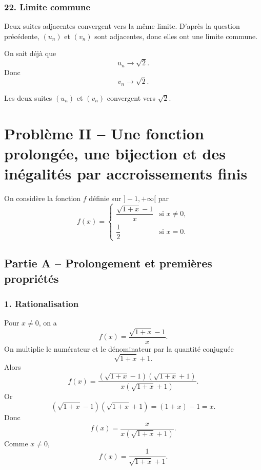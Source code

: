 \documentclass[11pt,a4paper]{article}
\begin{document}

\subsubsection*{22. Limite commune}

Deux suites adjacentes convergent vers la même limite. D'après la question précédente, \((u_n)\) et \((v_n)\) sont adjacentes, donc elles ont une limite commune.

On sait déjà que
\[
u_n\longrightarrow \sqrt2.
\]
Donc
\[
v_n\longrightarrow \sqrt2.
\]

\begin{resultatbox}
Les deux suites \((u_n)\) et \((v_n)\) convergent vers \(\sqrt2\).
\end{resultatbox}

\newpage


\section*{Problème II -- Une fonction prolongée, une bijection et des inégalités par accroissements finis}

On considère la fonction \(f\) définie sur \(]-1,+\infty[\) par
\[
f(x)=
\begin{cases}
\dfrac{\sqrt{1+x}-1}{x} & \text{si } x\neq 0,\\[1.2em]
\dfrac12 & \text{si } x=0.
\end{cases}
\]


\subsection*{Partie A -- Prolongement et premières propriétés}

\subsubsection*{1. Rationalisation}

Pour \(x\neq 0\), on a
\[
f(x)=\frac{\sqrt{1+x}-1}{x}.
\]
On multiplie le numérateur et le dénominateur par la quantité conjuguée
\[
\sqrt{1+x}+1.
\]
Alors
\[
f(x)
=
\frac{(\sqrt{1+x}-1)(\sqrt{1+x}+1)}{x(\sqrt{1+x}+1)}.
\]
Or
\[
(\sqrt{1+x}-1)(\sqrt{1+x}+1)
=
(1+x)-1=x.
\]
Donc
\[
f(x)=\frac{x}{x(\sqrt{1+x}+1)}.
\]
Comme \(x\neq 0\),
\[
f(x)=\frac1{\sqrt{1+x}+1}.
\]
\end{document}
